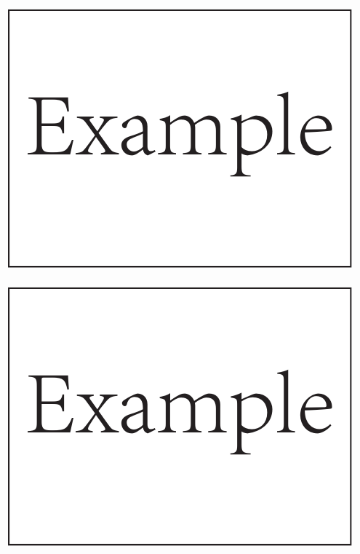 \begin{figure}[!htb]
	\centering
	\begin{subfigure}[b]{0.45\linewidth}
		\includegraphics[width=\linewidth]{Figures/Example.pdf}
		\caption{}
		\label{fig:2:2a}
	\end{subfigure}
	\hfil
	\begin{subfigure}[b]{0.45\linewidth}
		\includegraphics[width=\linewidth]{Figures/Example.pdf}
		\caption{}
		\label{fig:2:2b}
	\end{subfigure}
	\hfil
	\begin{subfigure}[b]{0.45\linewidth}

\end{subfigure}
\end{figure}
